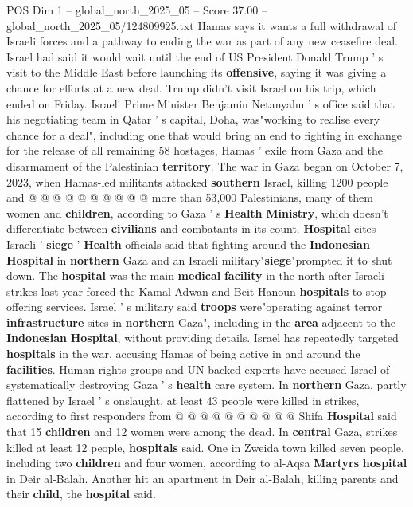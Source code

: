 \begin{textsample}{POS Dim 1 – global\_north\_2025\_05 – Score 37.00 – global\_north\_2025\_05/124809925.txt}
Hamas says it wants a full withdrawal of Israeli forces and a pathway to ending the war as part of any new ceasefire deal.
Israel had said it would wait until the end of US President Donald Trump ' s visit to the Middle East before launching its \textbf{offensive}, saying it was giving a chance for efforts at a new deal.
Trump didn't visit Israel on his trip, which ended on Friday.
Israeli Prime Minister Benjamin Netanyahu ' s office said that his negotiating team in Qatar ' s capital, Doha, was"working to realise every chance for a deal", including one that would bring an end to fighting in exchange for the release of all remaining 58 hostages, Hamas ' exile from Gaza and the disarmament of the Palestinian \textbf{territory}.
The war in Gaza began on October 7, 2023, when Hamas-led militants attacked \textbf{southern} Israel, killing 1200 people and @ @ @ @ @ @ @ @ @ @ more than 53,000 Palestinians, many of them women and \textbf{children}, according to Gaza ' s \textbf{Health} \textbf{Ministry}, which doesn't differentiate between \textbf{civilians} and combatants in its count. \textbf{Hospital} cites Israeli ' \textbf{siege} ' \textbf{Health} officials said that fighting around the \textbf{Indonesian} \textbf{Hospital} in \textbf{northern} Gaza and an Israeli military"\textbf{siege}"prompted it to shut down.
The \textbf{hospital} was the main \textbf{medical} \textbf{facility} in the north after Israeli strikes last year forced the Kamal Adwan and Beit Hanoun \textbf{hospitals} to stop offering services.
Israel ' s military said \textbf{troops} were"operating against terror \textbf{infrastructure} sites in \textbf{northern} Gaza", including in the \textbf{area} adjacent to the \textbf{Indonesian} \textbf{Hospital}, without providing details.
Israel has repeatedly targeted \textbf{hospitals} in the war, accusing Hamas of being active in and around the \textbf{facilities}.
Human rights groups and UN-backed experts have accused Israel of systematically destroying Gaza ' s \textbf{health} care system.
In \textbf{northern} Gaza, partly flattened by Israel ' s onslaught, at least 43 people were killed in strikes, according to first responders from @ @ @ @ @ @ @ @ @ @ Shifa \textbf{Hospital} said that 15 \textbf{children} and 12 women were among the dead.
In \textbf{central} Gaza, strikes killed at least 12 people, \textbf{hospitals} said.
One in Zweida town killed seven people, including two \textbf{children} and four women, according to al-Aqsa \textbf{Martyrs} \textbf{hospital} in Deir al-Balah.
Another hit an apartment in Deir al-Balah, killing parents and their \textbf{child}, the \textbf{hospital} said.

\end{textsample}
